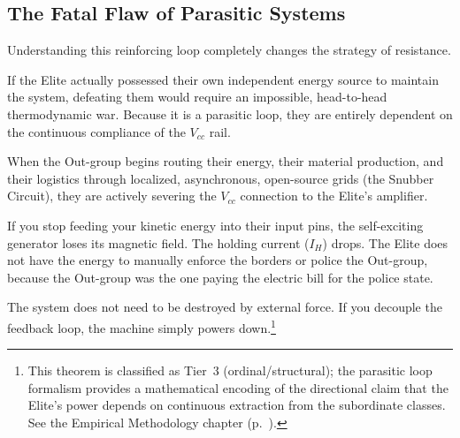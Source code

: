 \subsection{The Fatal Flaw of Parasitic Systems}

Understanding this reinforcing loop completely changes the strategy of resistance.

\begin{theorem}
If the Elite actually possessed their own independent energy source to maintain the system, defeating them would require an impossible, head-to-head thermodynamic war. Because it is a parasitic loop, they are entirely dependent on the continuous compliance of the $V_{cc}$ rail.

When the Out-group begins routing their energy, their material production, and their logistics through localized, asynchronous, open-source grids (the Snubber Circuit), they are actively severing the $V_{cc}$ connection to the Elite's amplifier.

If you stop feeding your kinetic energy into their input pins, the self-exciting generator loses its magnetic field. The holding current ($I_H$) drops. The Elite does not have the energy to manually enforce the borders or police the Out-group, because the Out-group was the one paying the electric bill for the police state.

The system does not need to be destroyed by external force. If you decouple the feedback loop, the machine simply powers down.\footnote{This theorem is classified as Tier~3 (ordinal/structural); the parasitic loop formalism provides a mathematical encoding of the directional claim that the Elite's power depends on continuous extraction from the subordinate classes. See the Empirical Methodology chapter (p.~\pageref{ch:empirical_methodology}).}
\end{theorem}

